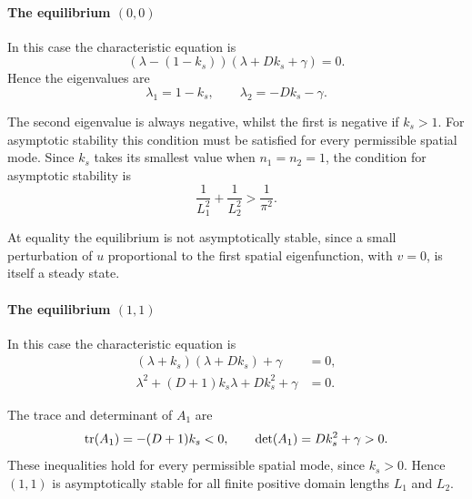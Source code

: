 \documentclass[a4paper,12pt]{article}
\begin{document}
\begin{enumerate}
{\begin{enumerate}[label=(\alph*)]
            \paragraph{The equilibrium $(0,0)$}
            In this case the characteristic equation is
            \begin{equation*}
                (\lambda-(1-k_s))(\lambda+Dk_s+\gamma)=0.
            \end{equation*}
            Hence the eigenvalues are
            \begin{equation*}
                \lambda_1=1-k_s,
                \qquad
                \lambda_2=-Dk_s-\gamma.
            \end{equation*}

            The second eigenvalue is always negative, whilst the
            first is negative if $k_s>1$. For asymptotic stability
            this condition must be satisfied for every permissible
            spatial mode. Since $k_s$ takes its smallest value
            when $n_1=n_2=1$, the condition for asymptotic stability
            is
            \begin{equation*}
                \boxed{
                    \frac{1}{L_1^2}+\frac{1}{L_2^2}>
                    \frac{1}{\pi^2}.
                }
            \end{equation*}

            At equality the equilibrium is not asymptotically
            stable, since a small perturbation of $u$ proportional
            to the first spatial eigenfunction, with $v=0$, is
            itself a steady state.

            \paragraph{The equilibrium $(1,1)$}
            In this case the characteristic equation is
            \begin{align*}
                (\lambda+k_s)(\lambda+Dk_s)+\gamma &=0,\\
                \lambda^2+(D+1)k_s\lambda+Dk_s^2+\gamma &=0.
            \end{align*}

            The trace and determinant of $A_1$ are
            \begin{equation*}
                \operatorname{tr}(A_1)=-(D+1)k_s<0,
                \qquad
                \det(A_1)=Dk_s^2+\gamma>0.
            \end{equation*}
            These inequalities hold for every permissible spatial
            mode, since $k_s>0$. Hence $(1,1)$ is asymptotically
            stable for all finite positive domain lengths $L_1$
            and $L_2$.


\end{enumerate}}
\end{enumerate}
\end{document}
